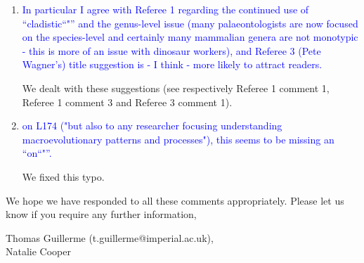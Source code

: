 \documentclass[12pt,letterpaper]{article}
\begin{document}
\begin{enumerate}

\item{\textcolor{blue}{In particular I agree with Referee 1 regarding the continued use of ``cladistic``"'' and the genus-level issue (many palaeontologists are now focused on the species-level and certainly many mammalian genera are not monotypic - this is more of an issue with dinosaur workers), and Referee 3 (Pete Wagner's) title suggestion is - I think - more likely to attract readers.}}

We dealt with these suggestions (see respectively Referee 1 comment 1, Referee 1 comment 3 and Referee 3 comment 1).


\item{\textcolor{blue}{on L174 ("but also to any researcher focusing understanding macroevolutionary patterns and processes"), this seems to be missing an ``on``"''.}}

We fixed this typo.
\end{enumerate}


We hope we have responded to all these comments appropriately. Please let us know if you require any further information,\\
\bigskip


Thomas Guillerme (t.guillerme@imperial.ac.uk),\\
Natalie Cooper
\end{document}
